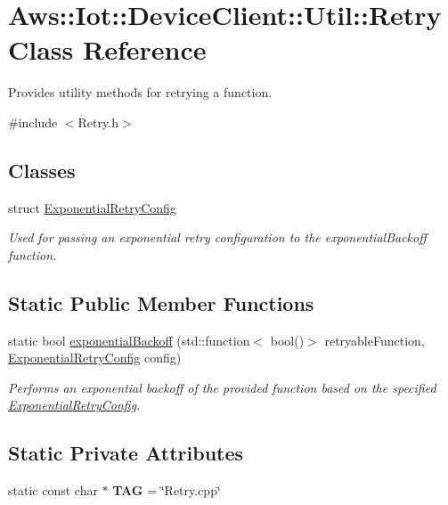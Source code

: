 \hypertarget{class_aws_1_1_iot_1_1_device_client_1_1_util_1_1_retry}{}\section{Aws\+:\+:Iot\+:\+:Device\+Client\+:\+:Util\+:\+:Retry Class Reference}
\label{class_aws_1_1_iot_1_1_device_client_1_1_util_1_1_retry}


Provides utility methods for retrying a function.  




{\ttfamily \#include $<$Retry.\+h$>$}

\subsection*{Classes}
\begin{DoxyCompactItemize}
\item 
struct \hyperlink{struct_aws_1_1_iot_1_1_device_client_1_1_util_1_1_retry_1_1_exponential_retry_config}{Exponential\+Retry\+Config}
\begin{DoxyCompactList}\small\item\em Used for passing an exponential retry configuration to the exponential\+Backoff function. \end{DoxyCompactList}\end{DoxyCompactItemize}
\subsection*{Static Public Member Functions}
\begin{DoxyCompactItemize}
\item 
static bool \hyperlink{class_aws_1_1_iot_1_1_device_client_1_1_util_1_1_retry_a6d55342ef0ae5d2a10e40b317e9c51cc}{exponential\+Backoff} (std\+::function$<$ bool()$>$ retryable\+Function, \hyperlink{struct_aws_1_1_iot_1_1_device_client_1_1_util_1_1_retry_1_1_exponential_retry_config}{Exponential\+Retry\+Config} config)
\begin{DoxyCompactList}\small\item\em Performs an exponential backoff of the provided function based on the specified \hyperlink{struct_aws_1_1_iot_1_1_device_client_1_1_util_1_1_retry_1_1_exponential_retry_config}{Exponential\+Retry\+Config}. \end{DoxyCompactList}\end{DoxyCompactItemize}
\subsection*{Static Private Attributes}
\begin{DoxyCompactItemize}
\item 
\mbox{\label{class_aws_1_1_iot_1_1_device_client_1_1_util_1_1_retry_a089016a730bb3f65c6173a1fe7f34116}} 
static const char $\ast$ {\bfseries T\+AG} = \char`\"{}Retry.\+cpp\char`\"{}
\end{DoxyCompactItemize}


